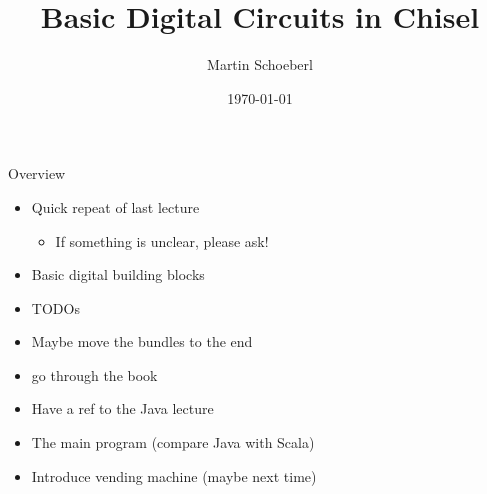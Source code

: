 \documentclass[xcolor=pdflatex,dvipsnames,table]{beamer}
\title{Basic Digital Circuits in Chisel}
\author{Martin Schoeberl}
\date{\today}
\institute{Technical University of Denmark\\
Embedded Systems Engineering}
\begin{document}
\begin{frame}
\titlepage
\end{frame}


\begin{frame}[fragile]{Overview}
\begin{itemize}
\item Quick repeat of last lecture
\begin{itemize}
\item If something is unclear, please ask!
\end{itemize}
\item Basic digital building blocks
\item TODOs
\item Maybe move the bundles to the end
\item go through the book
\item Have a ref to the Java lecture
\item The main program (compare Java with Scala)
\item Introduce vending machine (maybe next time)
\end{itemize}
\end{frame}
\end{document}

